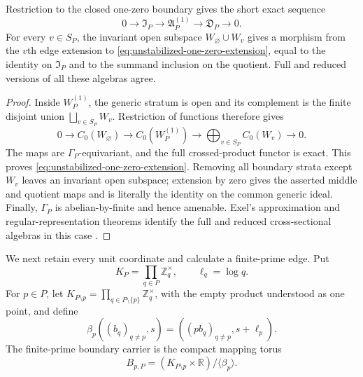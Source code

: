 \begin{theorem}
\label{thm:unstabilized-one-zero-extension}
Restriction to the closed one-zero boundary gives the short exact sequence
\begin{equation}
 0\longrightarrow\mathfrak I_P
 \longrightarrow\mathfrak A_P^{(1)}
 \longrightarrow\mathfrak D_P\longrightarrow0.
 \label{eq:unstabilized-one-zero-extension}
\end{equation}
For every $v\in S_P$, the invariant open subspace
$W_{\varnothing}\cup W_v$ gives a morphism from the $v$th edge extension
to \eqref{eq:unstabilized-one-zero-extension}, equal to the identity on
$\mathfrak I_P$ and to the summand inclusion on the quotient.
Full and reduced versions of all these algebras agree.
\end{theorem}

\begin{proof}
Inside $W_P^{(1)}$, the generic stratum is open and its complement is the
finite disjoint union $\bigsqcup_{v\in S_P}W_v$.  Restriction of functions
therefore gives
\[
 0\to C_0(W_{\varnothing})\to C_0(W_P^{(1)})
 \to\bigoplus_{v\in S_P}C_0(W_v)\to0.
\]
The maps are $\Gamma_P$-equivariant, and the full crossed-product functor is
exact.  This proves \eqref{eq:unstabilized-one-zero-extension}.  Removing all
boundary strata except $W_v$ leaves an invariant open subspace; extension by
zero gives the asserted middle and quotient maps and is literally the
identity on the common generic ideal.  Finally, $\Gamma_P$ is abelian-by-finite
and hence amenable.  Exel's approximation and regular-representation theorems
identify the full and reduced cross-sectional algebras in this case
\cite[Theorems~20.6--20.7]{exel2017}.
\end{proof}

We next retain every unit coordinate and calculate a finite-prime edge.  Put
\[
 K_P=\prod_{q\in P}\mathbb Z_q^{\times},\qquad
 \ell_q=\log q.
\]
For $p\in P$, let $K_{P\setminus p}=\prod_{q\in P\setminus\{p\}}
\mathbb Z_q^{\times}$, with the empty product understood as one point, and
define
\[
 \beta_p((b_q)_{q\ne p},s)
 =((p b_q)_{q\ne p},s+\ell_p).
\]
The finite-prime boundary carrier is the compact mapping torus
\begin{equation}
 B_{p,P}=(K_{P\setminus p}\times\mathbb R)/\langle\beta_p\rangle.
 \label{eq:multiplace-finite-mapping-torus}
\end{equation}

